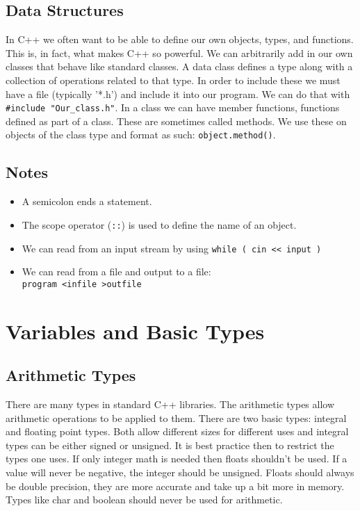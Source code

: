 \documentclass[12pt, a4paper]{report}
\begin{document}
\section{Data Structures}
In C++ we often want to be able to define our own objects, types, and functions. This is, in fact, what makes C++ so powerful. We can arbitrarily add in our own classes that behave like standard classes. 
A data class defines a type along with a collection of operations related to that type. In order to include these we must have a file (typically '*.h') and include it into our program. We can do that with \verb|#include "Our_class.h"|. In a class we can have member functions, functions defined as part of a class.
These are sometimes called methods. We use these on objects of the class type and format as such: \verb|object.method()|.
\section{Notes}

\begin{itemize}
  \item A semicolon ends a statement.
  \item The scope operator (\verb|::|) is used to define the name of an object.
  \item We can read from an input stream by using \verb|while ( cin << input )|
  \item We can read from a file and output to a file: \\ \verb|program <infile >outfile|
\end{itemize}

\chapter{Variables and Basic Types}
\section{Arithmetic Types}
There are many types in standard C++ libraries. The arithmetic types allow arithmetic operations to be applied to them. There are two basic types: integral and floating point types. Both allow different sizes for different uses and integral types can be either signed or unsigned.
It is best practice then to restrict the types one uses. If only integer math is needed then floats shouldn't be used. If a value will never be negative, the integer should be unsigned. 
Floats should always be double precision, they are more accurate and take up a bit more in memory.
Types like char and boolean should never be used for arithmetic.
\end{document}
